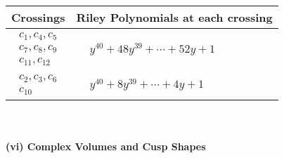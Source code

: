 \documentclass[1p]{elsarticle_modified}
\theoremstyle{definition}
\begin{document}
\begin{tabular}{m{50pt}|m{274pt}}
Crossings & \hspace{64pt}Riley Polynomials at each crossing \\
\hline $$\begin{aligned}c_{1},c_{4},c_{5}\\c_{7},c_{8},c_{9}\\c_{11},c_{12}\end{aligned}$$&$\begin{aligned}
&y^{40}+48 y^{39}+\cdots+52 y+1
\end{aligned}$\\
\hline $$\begin{aligned}c_{2},c_{3},c_{6}\\c_{10}\end{aligned}$$&$\begin{aligned}
&y^{40}+8 y^{39}+\cdots+4 y+1
\end{aligned}$\\
\hline
\end{tabular}\\~\\
\newpage\flushleft \textbf{(vi) Complex Volumes and Cusp Shapes}
\end{document}
